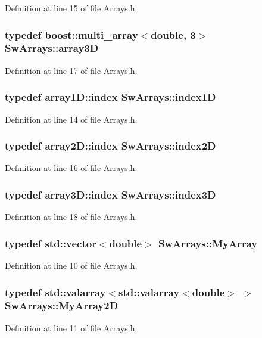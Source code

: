 Definition at line 15 of file Arrays.h.
\subsubsection{\setlength{\rightskip}{0pt plus 5cm}typedef boost::multi\_\-array$<$double, 3$>$ {\bf SwArrays::array3D}}\label{namespaceSwArrays_43b0dd0a084045f231ca949f96ba5ea1}




Definition at line 17 of file Arrays.h.
\subsubsection{\setlength{\rightskip}{0pt plus 5cm}typedef array1D::index {\bf SwArrays::index1D}}\label{namespaceSwArrays_4b9e52c6a771e1a70faec52ed9fe1844}




Definition at line 14 of file Arrays.h.
\subsubsection{\setlength{\rightskip}{0pt plus 5cm}typedef array2D::index {\bf SwArrays::index2D}}\label{namespaceSwArrays_491d8b119a7cdd28afdaa75447460abf}




Definition at line 16 of file Arrays.h.
\subsubsection{\setlength{\rightskip}{0pt plus 5cm}typedef array3D::index {\bf SwArrays::index3D}}\label{namespaceSwArrays_43df59437e7dfa7838e5d23628e245b8}




Definition at line 18 of file Arrays.h.
\subsubsection{\setlength{\rightskip}{0pt plus 5cm}typedef std::vector$<$double$>$ {\bf SwArrays::MyArray}}\label{namespaceSwArrays_817a6066415ba9925ccc7d7574a4845b}




Definition at line 10 of file Arrays.h.
\subsubsection{\setlength{\rightskip}{0pt plus 5cm}typedef std::valarray$<$std::valarray$<$double$>$ $>$ {\bf SwArrays::MyArray2D}}\label{namespaceSwArrays_881ca55341231b8b9ab6eb1e3a000fdb}




Definition at line 11 of file Arrays.h.